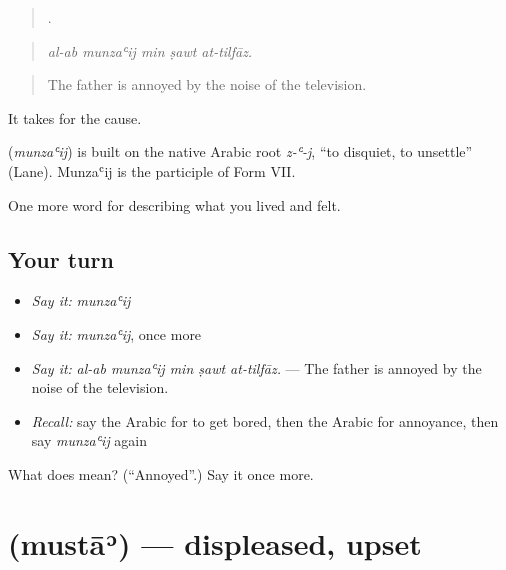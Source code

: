 \begin{quote}
    .
\end{quote}

\begin{quote}
\emph{al-ab munzaʿij min ṣawt at-tilfāz.}
\end{quote}

\begin{quote}
The father is annoyed by the noise of the television.
\end{quote}

It takes  for the cause.

\begin{cousinweb}
\textbf{} (\emph{munzaʿij}) is built on the native Arabic root \emph{z-ʿ-j}, \textquotedblleft{}to disquiet, to unsettle\textquotedblright{} (Lane). Munzaʿij is the participle of Form VII.
\end{cousinweb}

\begin{grammarlens}[title={What you've built}]
One more word for describing what you lived and felt.
\end{grammarlens}

\subsection*{Your turn}
\begin{itemize}
\raggedright
  \item \emph{Say it:} \emph{munzaʿij}
  \item \emph{Say it:} \emph{munzaʿij}, once more
  \item \emph{Say it:} \emph{al-ab munzaʿij min ṣawt at-tilfāz.} — The father is annoyed by the noise of the television.
  \item \emph{Recall:} say the Arabic for to get bored, then the Arabic for annoyance, then say \emph{munzaʿij} again
\end{itemize}

\begin{tcolorbox}[breakable,colback=teal!4,colframe=teal!35!black,title={Before you move on}]
What does  mean? (\textquotedblleft{}Annoyed\textquotedblright{}.) Say it once more.
\end{tcolorbox}
\section[\texorpdfstring{\ar{مستاء} (mustāʾ)}{مستاء (mustāʾ)}]{ (mustāʾ) — displeased, upset}

